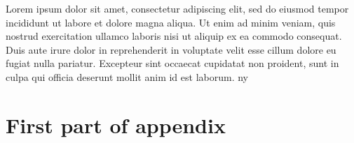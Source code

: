 \documentclass[
    12pt	%
    ]{article}
\begin{document}
Lorem ipsum dolor sit amet, consectetur adipiscing elit, sed do eiusmod tempor incididunt ut labore et dolore magna aliqua. Ut enim ad minim veniam, quis nostrud exercitation ullamco laboris nisi ut aliquip ex ea commodo consequat. Duis aute irure dolor in reprehenderit in voluptate velit esse cillum dolore eu fugiat nulla pariatur. Excepteur sint occaecat cupidatat non proident, sunt in culpa qui officia deserunt mollit anim id est laborum. \ac{ny}








\appendix
\section{First part of appendix}

\printacronyms[include-classes=abbrev,name=Abbreviations]
\end{document}
